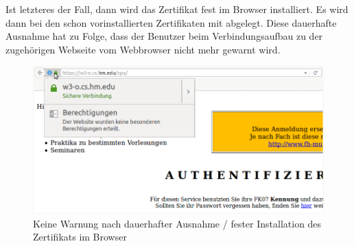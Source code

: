 \noindent
Ist letzteres der Fall, dann wird das Zertifikat fest im Browser installiert. Es wird dann bei den schon vorinstallierten Zertifikaten mit abgelegt. Diese dauerhafte Ausnahme hat zu Folge, dass der Benutzer beim Verbindungsaufbau zu der zugehörigen Webseite vom Webbrowser nicht mehr gewarnt wird. 
\begin{figure}[H]
	\centering
	\includegraphics[width=.7\linewidth]{images/trusted_ca.png}
	\caption{Keine Warnung nach dauerhafter Ausnahme / fester Installation des Zertifikats im Browser}
\end{figure}